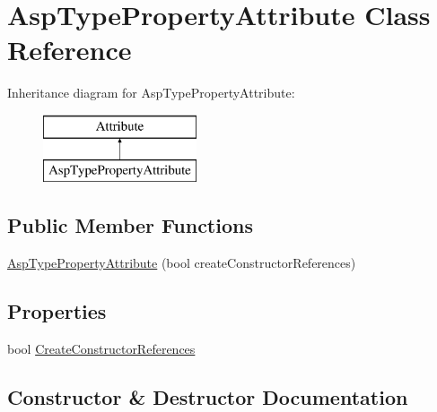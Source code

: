 \hypertarget{class_asp_type_property_attribute}{}\section{Asp\+Type\+Property\+Attribute Class Reference}
\label{class_asp_type_property_attribute}
Inheritance diagram for Asp\+Type\+Property\+Attribute\+:\begin{figure}[H]
\begin{center}
\leavevmode
\includegraphics[height=2.000000cm]{class_asp_type_property_attribute}
\end{center}
\end{figure}
\subsection*{Public Member Functions}
\begin{DoxyCompactItemize}
\item 
\mbox{\hyperlink{class_asp_type_property_attribute_a44e918652832a5c2272af6b3c85d12d1}{Asp\+Type\+Property\+Attribute}} (bool create\+Constructor\+References)
\end{DoxyCompactItemize}
\subsection*{Properties}
\begin{DoxyCompactItemize}
\item 
bool \mbox{\hyperlink{class_asp_type_property_attribute_a57bbcf991d77058648e6292b63726241}{Create\+Constructor\+References}}
\end{DoxyCompactItemize}


\subsection{Constructor \& Destructor Documentation}
\mbox{\label{class_asp_type_property_attribute_a44e918652832a5c2272af6b3c85d12d1}} 
